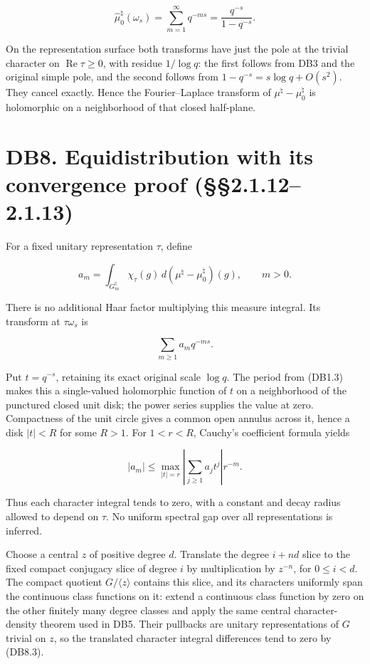\documentclass[
]{report}
\begin{document}
\[
 \widehat\mu_0^{\natural}(\omega_s)
   =\sum_{m=1}^{\infty}q^{-ms}
   =\frac{q^{-s}}{1-q^{-s}}.
 \tag{DB7.3}
\]

On the representation surface both transforms have just the pole at the
trivial character on \(\operatorname{Re}\tau\geq0\), with residue
\(1/\log q\): the first follows from DB3 and the original simple pole,
and the second follows from \(1-q^{-s}=s\log q+O(s^2)\). They cancel
exactly. Hence the Fourier--Laplace transform of
\(\mu^\natural-\mu_0^\natural\) is holomorphic on a neighborhood of that
closed half-plane.

\section{DB8. Equidistribution with its convergence proof
(§§2.1.12--2.1.13)}\label{db8.-equidistribution-with-its-convergence-proof-2.1.122.1.13}

For a fixed unitary representation \(\tau\), define

\[
 a_m=\int_{G_m^\natural}\chi_\tau(g)
                    \,d(\mu^\natural-\mu_0^\natural)(g),\qquad m>0.
 \tag{DB8.1}
\]

There is no additional Haar factor multiplying this measure integral.
Its transform at \(\tau\omega_s\) is

\[
 \sum_{m\geq1}a_mq^{-ms}.
 \tag{DB8.2}
\]

Put \(t=q^{-s}\), retaining its exact original scale \(\log q\). The
period from (DB1.3) makes this a single-valued holomorphic function of
\(t\) on a neighborhood of the punctured closed unit disk; the power
series supplies the value at zero. Compactness of the unit circle gives
a common open annulus across it, hence a disk \(|t|<R\) for some
\(R>1\). For \(1<r<R\), Cauchy's coefficient formula yields

\[
 |a_m|\leq \max_{|t|=r}\left|\sum_{j\geq1}a_jt^j\right|r^{-m}.
 \tag{DB8.3}
\]

Thus each character integral tends to zero, with a constant and decay
radius allowed to depend on \(\tau\). No uniform spectral gap over all
representations is inferred.

Choose a central \(z\) of positive degree \(d\). Translate the degree
\(i+nd\) slice to the fixed compact conjugacy slice of degree \(i\) by
multiplication by \(z^{-n}\), for \(0\leq i<d\). The compact quotient
\(G/\langle z\rangle\) contains this slice, and its characters uniformly
span the continuous class functions on it: extend a continuous class
function by zero on the other finitely many degree classes and apply the
same central character-density theorem used in DB5. Their pullbacks are
unitary representations of \(G\) trivial on \(z\), so the translated
character integral differences tend to zero by (DB8.3).
\end{document}
